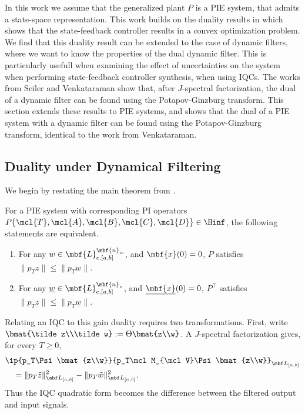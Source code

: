In this work we assume that the generalized plant $P$ is a PIE system, that admits a state-space representation.
This work builds on the duality results in \cite{shivaknew} which shows that the state-feedback controller results in a convex optimization problem.
We find that this duality result can be extended to the case of dynamic filters, where we want to know the properties of the dual dynamic filter. This is particularly
usefull when examining the effect of uncertainties on the system when performing state-feedback controller synthesis, when using IQCs. The works from
Seiler and Venkataraman \cite{6915700,venkataraman} show that, after $J$-spectral factorization, the dual of a dynamic filter can be found using the Potapov-Ginzburg transform.
This section extends these results to PIE systems, and shows that the dual of a PIE system with a dynamic filter can be found
using the Potapov-Ginzburg transform, identical to the work from Venkataraman. 

\subsection{Duality under Dynamical Filtering}
We begin by restating the main theorem from \cite{shivaknew}.



\begin{theorem}\label{thm:dual-l2-gain}
For a PIE system with corresponding PI operators $P\{\mcl{T}, \mcl{A}, \mcl{B},
\mcl{C}, \mcl{D}\}\in\Hinf$, the following statements are equivalent.
\begin{enumerate}
\item For any $w\in\mbf{L}_{\mathrm{e},[a,b]}^{\mbf{n}_w}$, and $\mbf{x}(0)=0$, $P$
satisfies $\|p_T {z}\| \leq \|p_T {w}\|$.
\item For any $\underline{w}\in\mbf{L}_{\mathrm{e},[a,b]}^{\mbf{n}_z}$, and
$\underline{\mbf{x}}(0)=0$, $P^\top$ satisfies $\|p_T \underline{z}\| \leq
\|p_T \underline{w}\|$.
\end{enumerate}
\end{theorem}
Relating an IQC to this gain duality requires two transformations. First,
write $\bmat{\tilde z\\\tilde w}:=\Theta\bmat{z\\w}$. A $J$-spectral
factorization gives, for every $T\geq0$,
\begin{equation*}
\begin{aligned}
&\ip{p_T\Psi\bmat{z\\w}}
{p_T\mcl M_{\mcl V}\Psi\bmat{z\\w}}_{\mbf L_{[a,b]}}\\
&\quad=
\|p_T\tilde z\|_{\mbf L_{[a,b]}}^2
-\|p_T\tilde w\|_{\mbf L_{[a,b]}}^2.
\end{aligned}
\end{equation*}
Thus the IQC quadratic form becomes the difference between the filtered
output and input signals. 

